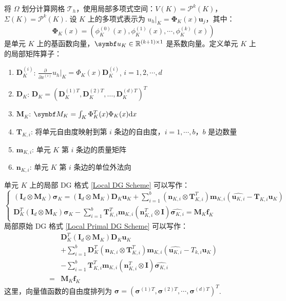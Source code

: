 将 \(\Omega\) 划分计算网格 \(\mathcal{T}_{h}\)，使用局部多项式空间：\(V(K) = \mathscr{P}^{k}(K)\)，\(\Sigma(K) = \mathscr{P}^{k}(K)\). 设 \(K\) 上的多项式表示为 \(u_{h}\big|_{K} = \bm\Phi_{K}(x)\bm u_{j}\)，其中：
\begin{equation}
	\bm\Phi_{K}(x)
	= \left(\phi_{K}^{(0)}(x), \phi_{K}^{(1)}(x), \cdots, \phi_{K}^{(k)}(x)\right)
\end{equation}
是单元 \(K\) 上的基函数向量，\(\bm{u}_{K} \in \R^{(k+1)\times 1}\) 是系数向量。定义单元 \(K\) 上的局部矩阵算子：
\begin{enumerate}
	\item \(\bm{D}_{K}^{(i)}\): \(\frac{\partial}{\partial x^{(i)}} u_{h}\big|_{K} = \Phi_{K}(x)\bm{D}_{K}^{(i)} \), \(i=1,2,\cdots, d\)
	\item \(\bm{D}_{K}\): \(\bm{D}_{K} = \left(\bm{D}_{K}^{(1)T}, \bm{D}_{K}^{(2)T}, \ldots, \bm{D}_{K}^{(d)T}\right)^{T}\)
	\item \(\bm{M}_{K}\): \(\bm{M}_{K} = \int_{K} \Phi_{K}^{T}(x) \Phi_{K}(x) \d x\)
	\item \(\bm{T}_{K, i}\): 将单元自由度映射到第 \(i\) 条边的自由度，\(i=1,\cdots,b\)，\(b\) 是边数量
	\item \(\bm{m}_{K, i}\): 单元 \(K\) 第 \(i\) 条边的质量矩阵
	\item \(\bm{n}_{K, i}\): 单元 \(K\) 第 \(i\) 条边的单位外法向
\end{enumerate}
单元 \(K\) 上的局部 DG 格式 \eqref{Local DG Scheme} 可以写作：
\begin{equation}\label{Matrix Form of Local DG Scheme}
	\begin{cases}
		\left(\bm I_{d} \otimes \bm{M}_{K}\right) \bm{\sigma}_{K} = \left(\bm I_{d} \otimes \bm{M}_{K}\right) \bm{D}_{K} \bm{u}_{K} + \sum\limits_{i=1}^{b} \left(\bm{n}_{K, i} \otimes \bm{T}_{K, i}^{T}\right) \bm{m}_{K, i} \left(\widehat{\bm{u}_{K, i}} - \bm{T}_{K, i} \bm{u}_{K}\right) \\
		\bm{D}_{K}^{T}\left(\bm{I}_{d}\otimes\bm{M}_{K}\right)\bm{\sigma}_{K} - \sum\limits_{i=1}^{b} \bm{T}_{K, i}^{T} \bm{m}_{K, i} \left(\bm{n}_{K, i}^T \otimes \bm{I}\right) \widehat{\bm{\sigma}_{K, i}} = \bm{M}_{K} \bm{f}_{K}
	\end{cases}
\end{equation}
局部原始 DG 格式 \eqref{Local Primal DG Scheme} 可以写作：
\begin{equation}\label{Matrix Form of Local Primal DG Scheme}
	\begin{aligned}
		& \bm{D}_{K}^{T} \left(\bm I_{d} \otimes \bm{M}_{K}\right) \bm{D}_{K}\bm{u}_{K} \\
		& + \sum\limits_{i=1}^{b} \bm{D}_{K}^{T} \left(\bm{n}_{K, i} \otimes \bm{T}_{K, i}^{T}\right) \bm{m}_{K, i} \left(\widehat{\bm{u}_{K, i}} - T_{k, i} \bm{u}_{K}\right) \\
		& - \sum_{i=1}^{b} \bm{T}_{K, i}^{T} \bm{m}_{K, i} \left(\bm{n}_{K, i}^T \otimes \bm{I}\right) \widehat{\bm{\sigma}_{K, i}} \\
		= & \bm M_{K} \bm{f}_{K}
	\end{aligned}
\end{equation}
这里，向量值函数的自由度排列为 \(\bm\sigma = \left(\bm\sigma^{(1)T}, \bm\sigma^{(2)T}, \cdots, \bm\sigma^{(d)T}\right)^{T}\).


